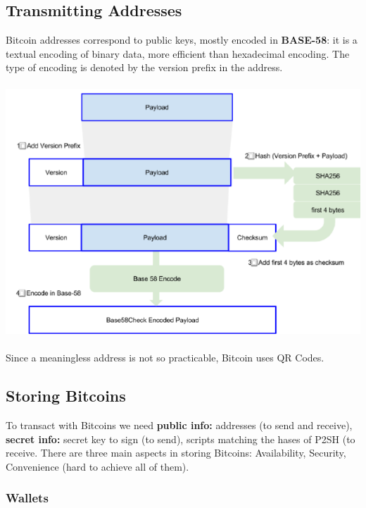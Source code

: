 \documentclass{article}
\begin{document}
\subsection{Transmitting Addresses}
Bitcoin addresses correspond to public keys, mostly encoded in \textbf{BASE-58}: it is a textual encoding of binary data, more efficient than hexadecimal encoding. The type of encoding is denoted by the version prefix in the address.\\\\
\includegraphics[scale=0.6]{36.png}\\\\
Since a meaningless address is not so practicable, Bitcoin uses QR Codes.
\subsection{Storing Bitcoins}
To transact with Bitcoins we need \textbf{public info: }addresses (to send and receive), \textbf{secret info: }secret key to sign (to send), scripts matching the hases of P2SH (to receive.
There are three main aspects in storing Bitcoins: Availability, Security, Convenience (hard to achieve all of them).
\subsubsection{Wallets}
\end{document}
